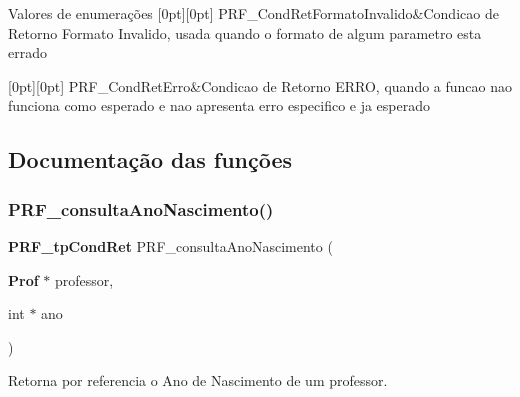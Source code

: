 \begin{DoxyEnumFields}{Valores de enumerações}
[0pt][0pt]{}\mbox{\label{group__modulo_professor_gga777e215896d573d2e99d98793b1f0ed1a4e4972771e1e02c90dbf55d99dd14ea9}} 
P\+R\+F\+\_\+\+Cond\+Ret\+Formato\+Invalido&Condicao de Retorno Formato Invalido, usada quando o formato de algum parametro esta errado \\
\hline

[0pt][0pt]{}\mbox{\label{group__modulo_professor_gga777e215896d573d2e99d98793b1f0ed1aa4b0018e831d3ec28c8b6a0006bceb46}} 
P\+R\+F\+\_\+\+Cond\+Ret\+Erro&Condicao de Retorno E\+R\+RO, quando a funcao nao funciona como esperado e nao apresenta erro especifico e ja esperado \\
\hline

\end{DoxyEnumFields}


\subsection{Documentação das funções}
\mbox{\label{group__modulo_professor_ga80b3e3e5dfb090a9c28280073cd471f5}} 
\subsubsection{P\+R\+F\+\_\+consulta\+Ano\+Nascimento()}
{\footnotesize\ttfamily \textbf{ P\+R\+F\+\_\+tp\+Cond\+Ret} P\+R\+F\+\_\+consulta\+Ano\+Nascimento (\begin{DoxyParamCaption}\item[{\textbf{ Prof} $\ast$}]{professor,  }\item[{int $\ast$}]{ano }\end{DoxyParamCaption})}



Retorna por referencia o Ano de Nascimento de um professor. 


